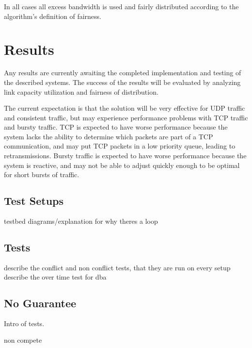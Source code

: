 \documentclass[accepted,single]{gipaper}
\begin{document}
In all cases all excess bandwidth is used and fairly distributed according to the algorithm's definition of fairness.

\section{Results}
\label{results}

Any results are currently awaiting the completed implementation and testing of the described systems. The success of the results will be evaluated by analyzing link capacity utilization and fairness of distribution.

The current expectation is that the solution will be very effective for UDP traffic and consistent traffic, but may experience performance problems with TCP traffic and bursty traffic. TCP is expected to have worse performance because the system lacks the ability to determine which packets are part of a TCP communication, and may put TCP packets in a low priority queue, leading to retransmissions. Bursty traffic is expected to have worse performance because the system is reactive, and may not be able to adjust quickly enough to be optimal for short bursts of traffic.

\subsection{Test Setups}
\label{result_setups}

testbed diagrams/explanation for why theres a loop

\subsection{Tests}
\label{result_tests}

describe the conflict and non conflict tests, that they are run on every setup
describe the over time test for dba

\subsection{No Guarantee}
\label{no_guar}

Intro of tests.

non compete
\end{document}

